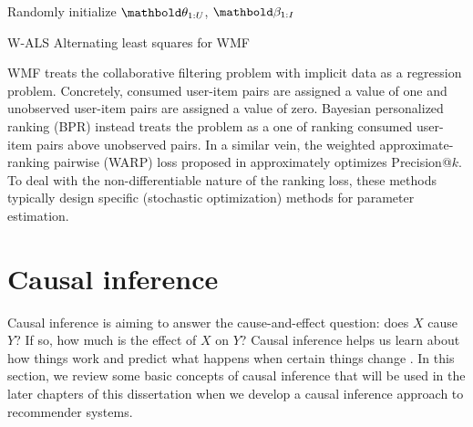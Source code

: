 \begin{algorithm}
\DontPrintSemicolon %
Randomly initialize $\mb\theta_{1:U}$, $\mb\beta_{1:I}$\;
\;
\caption{{\sc W-ALS} Alternating least squares for \gls{WMF}}
\label{chpt:background:algo:wmf}
\end{algorithm}

\gls{WMF} treats the collaborative filtering problem with implicit data as a
regression problem. Concretely, consumed user-item pairs are assigned a
value of one and unobserved user-item pairs are assigned a value of zero.
Bayesian personalized ranking (BPR) \citep{rendle2009bpr,
rendle2014improving} instead treats the problem as a one of ranking
consumed user-item pairs above unobserved pairs.
In a similar vein, the weighted approximate-ranking pairwise (WARP) loss
proposed in \citet{weston2011wsabie} approximately optimizes Precision@$k$. 
To deal with the non-differentiable nature of the ranking
loss, these methods typically design specific (stochastic optimization)
methods for parameter estimation.


\section{Causal inference}\label{chpt:background:sec:causal}

Causal inference is aiming to answer the cause-and-effect question: does $X$ cause $Y$? If so, how much is the effect of $X$ on $Y$? Causal inference helps us learn about how things work and predict what happens when certain things change \citep{morgan2014counterfactuals,imbens2015causal}. 
In this section, we review some basic concepts of causal inference that will be used in the later chapters of this dissertation when we develop a causal inference approach to recommender systems.  

